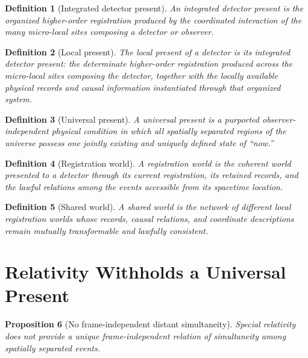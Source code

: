 \documentclass[12pt,onecolumn]{article}
\newtheorem{proposition}{Proposition}[section]
\newtheorem{definition}[proposition]{Definition}
\begin{document}
\begin{definition}[Integrated detector present]
\label{def:integrated-present}
An integrated detector present is the organized higher-order registration produced by the coordinated interaction of the many micro-local sites composing a detector or observer.
\end{definition}



\begin{definition}[Local present]
\label{def:local-present}
The local present of a detector is its integrated detector present: the determinate higher-order registration produced across the micro-local sites composing the detector, together with the locally available physical records and causal information instantiated through that organized system.
\end{definition}

\begin{definition}[Universal present]
\label{def:universal-present}
A universal present is a purported observer-independent physical condition in which all spatially separated regions of the universe possess one jointly existing and uniquely defined state of ``now.''
\end{definition}

\begin{definition}[Registration world]
\label{def:registration-world}
A registration world is the coherent world presented to a detector through its current registration, its retained records, and the lawful relations among the events accessible from its spacetime location.
\end{definition}

\begin{definition}[Shared world]
\label{def:shared-world}
A shared world is the network of different local registration worlds whose records, causal relations, and coordinate descriptions remain mutually transformable and lawfully consistent.
\end{definition}

\section{Relativity Withholds a Universal Present}

\begin{proposition}[No frame-independent distant simultaneity]
\label{prop:no-global-simultaneity}
Special relativity does not provide a unique frame-independent relation of simultaneity among spatially separated events.
\end{proposition}
\end{document}
